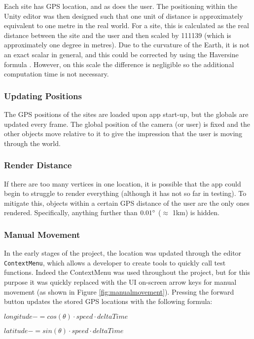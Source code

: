 \documentclass[12pt, a4paper]{article}
\begin{document}
Each site has GPS location, and as does the user. The positioning within the Unity editor was then designed such that one unit of distance is approximately equivalent to one metre in the real world. For a site, this is calculated as the real distance between the site and the user and then scaled by 111139 (which is approximately one degree in metres). Due to the curvature of the Earth, it is not an exact scalar in general, and this could be corrected by using the Haversine formula \cite{movement:haversine}. However, on this scale the difference is negligible so the additional computation time is not necessary.

\subsubsection{Updating Positions}
The GPS positions of the sites are loaded upon app start-up, but the globals are updated every frame. The global position of the camera (or user) is fixed and the other objects move relative to it to give the impression that the user is moving through the world. 

\subsubsection{Render Distance}
If there are too many vertices in one location, it is possible that the app could begin to struggle to render everything (although it has not so far in testing). To mitigate this, objects within a certain GPS distance of the user are the only ones rendered. Specifically, anything further than $0.01\degree$ ($\approx$ 1km) is hidden.

\subsubsection{Manual Movement}
\label{manualmovement}
In the early stages of the project, the location was updated through the editor \verb|ContextMenu|, which allows a developer to create tools to quickly call test functions. Indeed the ContextMenu was used throughout the project, but for this purpose it was quickly replaced with the UI on-screen arrow keys for manual movement (as shown in Figure \ref{fig:manualmovement}). Pressing the forward button updates the stored GPS locations with the following formula:

\hspace{1cm} $longitude -= cos(\theta) \cdot speed \cdot deltaTime$

\hspace{1cm} $latitude -= sin(\theta) \cdot speed \cdot deltaTime$
\end{document}

